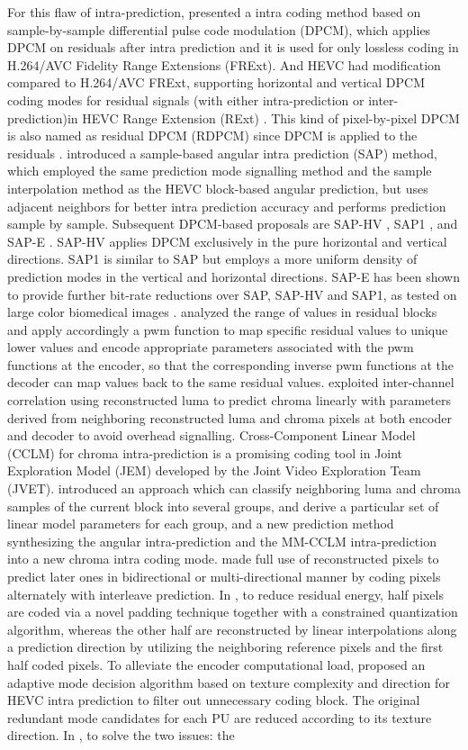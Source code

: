 \documentclass[journal]{IEEEtran}
\begin{document}
For this flaw of intra-prediction, \cite{d} presented a intra coding method based on sample-by-sample differential pulse code modulation (DPCM), which applies DPCM on residuals after intra prediction and it is used for only lossless coding in H.264/AVC Fidelity Range Extensions (FRExt). And HEVC had modification compared to H.264/AVC FRExt, supporting horizontal and vertical DPCM coding modes for residual signals (with either intra-prediction or inter-prediction)in HEVC Range Extension (RExt) \cite{e}\cite{h}. This kind of pixel-by-pixel DPCM is also named as residual DPCM (RDPCM) since DPCM is applied to the residuals \cite{i}.
 \cite{09} introduced a sample-based angular intra prediction (SAP) method, which employed the same prediction mode signalling method and the sample interpolation method as the HEVC block-based angular prediction, but uses adjacent neighbors for better intra prediction accuracy and performs prediction sample by sample. Subsequent DPCM-based proposals are SAP-HV \cite{10}, SAP1 \cite{11}, and SAP-E \cite{12}. SAP-HV applies DPCM exclusively in the pure horizontal and vertical directions. SAP1 is similar to SAP but employs a more uniform density of prediction modes in the vertical and horizontal directions. SAP-E has been shown to provide further bit-rate reductions over SAP, SAP-HV and SAP1, as tested on large color biomedical images \cite{12}. \cite{13} analyzed the range of values in residual blocks and apply accordingly a pwm function to map specific residual values to unique lower values and encode appropriate parameters associated with the pwm functions at the encoder, so that the corresponding inverse pwm functions at the decoder can map values back to the same residual values. \cite{14} exploited inter-channel correlation using reconstructed luma to predict chroma linearly with parameters derived from neighboring reconstructed luma and chroma pixels at both encoder and decoder to avoid overhead signalling. Cross-Component Linear Model (CCLM) for chroma intra-prediction is a promising coding tool in Joint Exploration Model (JEM) developed by the Joint Video Exploration Team (JVET). \cite{15} introduced an approach which can classify neighboring luma and chroma samples of the current block into several groups, and derive a particular set of linear model parameters for each group, and a new prediction method synthesizing the angular intra-prediction and the MM-CCLM intra-prediction into a new chroma intra coding mode. \cite{16} made full use of reconstructed pixels to predict later ones in bidirectional or multi-directional manner by coding pixels alternately with interleave prediction. In \cite{17}, to reduce residual energy, half pixels are coded via a novel padding technique together with a constrained quantization algorithm, whereas the other half are reconstructed by linear interpolations along a prediction direction by utilizing the neighboring reference pixels and the first half coded pixels. To alleviate the encoder computational load, \cite{18} proposed an adaptive mode decision algorithm based on texture complexity and direction for HEVC intra prediction to filter out unnecessary coding block. The original redundant mode candidates for each PU are reduced according to its texture direction. In \cite{19}, to solve the two issues: the 
\end{document}
